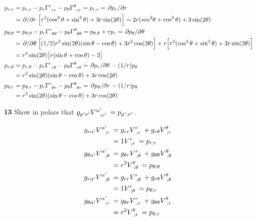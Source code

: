 \documentclass[gr-notes.tex]{subfiles}
\begin{document}
\begin{align*}
  p_{r;r} &=
  p_{r,r} -
  p_r \tensor{\Gamma}{^r_{rr}} -
  p_\theta \tensor{\Gamma}{^\theta_{rr}} =
  p_{r,r} = \pdv*{p_r}{r}
  \\ &=
  \pdv*{r} \qty[ r^2 (\cos^3\theta + \sin^3\theta) + 3 r \sin(2\theta) ] =
  2 r (sin^3\theta + \cos^3\theta) + 3 \sin(2\theta)
  \\
  p_{\theta;\theta} &=
  p_{\theta,\theta} -
  p_r \tensor{\Gamma}{^r_{\theta\theta}} -
  p_\theta \tensor{\Gamma}{^\theta_{\theta\theta}} =
  p_{\theta,\theta} + r p_r =
  \pdv*{p_\theta}{\theta}
  \\ &=
  \pdv*{\theta} \qty[
    (1/2) r^3 \sin(2\theta) (\sin\theta - \cos\theta) +
    3 r^2 \cos(2\theta)
  ] +
  r \qty[
    r^2 (\cos^3\theta + \sin^3\theta) + 3 r \sin(2\theta)
  ]
  \\ &=
  r^2 \sin(2\theta) \qty[ r (\sin\theta + \cos\theta) - 3 ]
  \\
  p_{r;\theta} &=
  p_{r,\theta} -
  p_r \tensor{\Gamma}{^r_{r\theta}} -
  p_\theta \tensor{\Gamma}{^\theta_{r\theta}} =
  \pdv*{p_r}{\theta} - (1/r) p_\theta
  \\ &=
  r^2 \sin(2\theta) (\sin\theta - \cos\theta) + 3 r \cos(2\theta)
  \\
  p_{\theta;r} &=
  p_{\theta,r} -
  p_r \tensor{\Gamma}{^r_{\theta r}} -
  p_\theta \tensor{\Gamma}{^\theta_{\theta r}} =
  \pdv*{p_\theta}{r} - (1/r) p_\theta
  \\ &=
  r^2 \sin(2\theta) (\sin\theta - \cos\theta) + 3 r \cos(2\theta)
\end{align*}


\textbf{13}
Show in polars that $g_{\mu'\nu'} \tensor{V}{^{\alpha'}_{;\nu'}} = p_{\mu';\nu'}$.

\begin{align*}
  g_{r\alpha'} \tensor{V}{^{\alpha'}_{;r}} &=
  g_{rr} \tensor{V}{^{r}_{;r}} + g_{r\theta} \tensor{V}{^{\theta}_{;r}}
  \\ &=
  1 \tensor{V}{^r_{;r}} =
  p_{r;r}
  \\
  g_{\theta\alpha'} \tensor{V}{^{\alpha'}_{;\theta}} &=
  g_{\theta r} \tensor{V}{^r_{;\theta}} +
  g_{\theta\theta} \tensor{V}{^\theta_{;\theta}}
  \\ &=
  r^2 \tensor{V}{^\theta_{;\theta}} =
  p_{\theta;\theta}
  \\
  g_{r \alpha'} \tensor{V}{^{\alpha'}_{;\theta}} &=
  g_{rr} \tensor{V}{^r_{;\theta}} +
  g_{r\theta} \tensor{V}{^\theta_{;\theta}}
  \\ &=
  1 \tensor{V}{^r_{;\theta}} =
  p_{\theta;r}
  \\
  g_{\theta\alpha'} \tensor{V}{^{\alpha'}_{;r}} &=
  g_{\theta r} \tensor{V}{^r_{;r}} +
  g_{\theta\theta} \tensor{V}{^\theta_{;r}}
  \\ &=
  r^2 \tensor{V}{^\theta_{;r}} =
  p_{\theta;r}
\end{align*}
\end{document}
